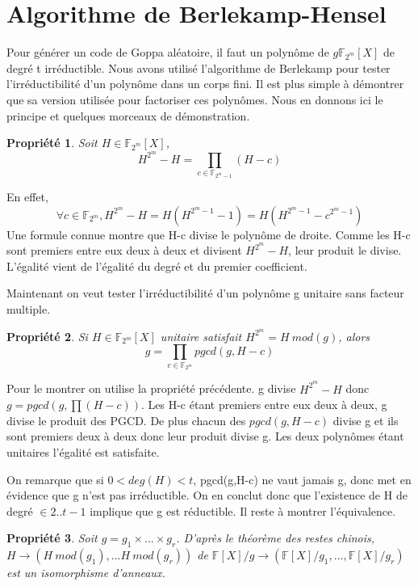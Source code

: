 \documentclass{article}
\newtheorem{prop}{Propriété}
\begin{document}
	\section{Algorithme de Berlekamp-Hensel}
		\label{BH}
		\cite{berlekamp}
		Pour générer un code de Goppa aléatoire, il faut un polynôme de $g \mathbb{F}_{2^{m}}[X] $ de degré t irréductible.
		Nous avons utilisé l'algorithme de Berlekamp pour tester l'irréductibilité d'un polynôme dans un corps fini.
		Il est plus simple à démontrer que sa version utilisée pour factoriser ces polynômes.
		Nous en donnons ici le principe et quelques morceaux de démonstration.

		\begin{prop}
			Soit $H \in \mathbb{F}_{2^{m}}[X]$, 
			$$H^{2^{m}} - H = \prod_{c \in \mathbb{F}_{2^{m}-1}}(H-c)$$
		\end{prop}
		En effet,
		$$ \forall c \in \mathbb{F}_{2^{m}}, H^{2^{m}}-H = H(H^{2^{m}-1}-1) = H(H^{2^{m}-1}-c^{2^{m}-1})$$
		Une formule connue montre que H-c divise le polynôme de droite.
		Comme les H-c sont premiers entre eux deux à deux et divisent $ H^{2^{m}} -H $, leur produit le divise.
		L'égalité vient de l'égalité du degré et du premier coefficient.

		Maintenant on veut tester l'irréductibilité d'un polynôme g unitaire sans facteur multiple.
		\begin{prop}
			Si $H \in \mathbb{F}_{2^{m}}[X]$ unitaire satisfait $H^{2^{m}} = H \ mod(g)$, alors 
			$$g = \prod_{c\in \mathbb{F}_{2^{m}}}pgcd(g,H-c)$$
		\end{prop}

		Pour le montrer on utilise la propriété précédente.
		g divise $H^{2^{m}} - H$ donc $g = pgcd(g,\prod(H-c))$.
		Les H-c étant premiers entre eux deux à deux, g divise le produit des PGCD.
		De plus chacun des $pgcd(g,H-c)$ divise g et ils sont premiers deux à deux donc leur produit divise g.
		Les deux polynômes étant unitaires l'égalité est satisfaite.

		On remarque que si $0<deg(H) <t$, pgcd(g,H-c) ne vaut jamais g, donc met en évidence que g n'est pas irréductible.
		On en conclut donc que l'existence de H  de degré $\in 2..t-1$ implique que g est réductible.
		Il reste à montrer l'équivalence.

		\begin{prop}
			Soit $g = g_{1} \times ... \times g_{r}$.
			D'après le théorème des restes chinois, $H \rightarrow (H \ mod(g_{1}),...H \ mod(g_{r}))$ de $\mathbb{F}[X]/g \rightarrow (\mathbb{F}[X]/g_{1},...,\mathbb{F}[X]/g_{r})$ est un isomorphisme d'anneaux.
		\end{prop}
\end{document}
